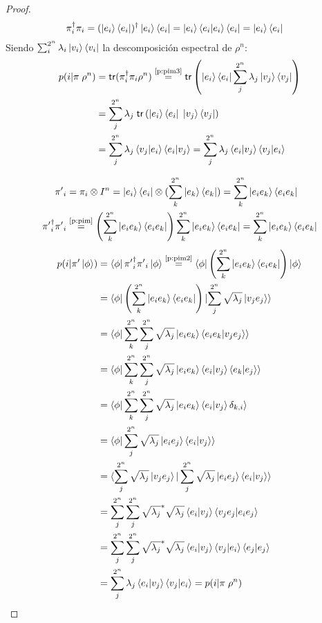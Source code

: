 \begin{proof}
\begin{align}
   \pi_i^\dagger\pi_i &= (\ket{e_i}\bra{e_i})^\dagger \ket{e_i}\bra{e_i} = \ket{e_i}\braket{e_i|e_i}\bra{e_i} = \ket{e_i}\bra{e_i} \label{p:pim3}
\end{align}
Siendo $\sum_i^{2^n} \lambda_i \ket{v_i}\bra{v_i}$ la descomposición espectral de $\rho^n$:
\begin{align}
    p(i|\pi\;\rho^n) &= \mathsf{tr}(\pi_i^\dagger\pi_i \rho^n) \stackrel{\textrm{\ref{p:pim3}}}{=} \mathsf{tr}\left(\ket{e_i}\bra{e_i} \sum_j^{2^n} \lambda_j \ket{v_j}\bra{v_j}\right) \nonumber \\
    &= \sum_j^{2^n} \lambda_j\; \mathsf{tr}\left(\ket{e_i}\bra{e_i}\; \ket{v_j}\bra{v_j}\right) \nonumber  \\
    &= \sum_j^{2^n} \lambda_j \braket{v_j|e_i} \braket{e_i|v_j} = \sum_j^{2^n} \lambda_j  \braket{e_i|v_j} \braket{v_j|e_i}
\end{align}

\begin{align}
    {\pi'}_i &= \pi_i \otimes I^n = \ket{e_i}\bra{e_i} \otimes (\sum_k^{2^n} \ket{e_k}\bra{e_k}) = \sum_k^{2^n} \ket{e_i e_k}\bra{e_i e_k} \label{p:pim} \\
    {\pi'}_i^\dagger{\pi'}_i &\stackrel{\textrm{\ref{p:pim}}}{=} \left(\sum_k^{2^n} \ket{e_i e_k}\bra{e_i e_k}\right) \sum_k^{2^n} \ket{e_i e_k}\bra{e_i e_k} = \sum_k^{2^n} \ket{e_i e_k}\bra{e_i e_k} \label{p:pim2}
\end{align}
\begin{align}
    p(i|\pi'\ket{\phi}) &= \bra{\phi}{\pi'}_i^\dagger{\pi'}_i\ket{\phi} \stackrel{\textrm{\ref{p:pim2}}}{=} \bra{\phi} \left(\sum_k^{2^n} \ket{e_i e_k}\bra{e_i e_k}\right)\ket{\phi} \nonumber \\
    &= \bra{\phi} \left(\sum_k^{2^n} \ket{e_i e_k}\bra{e_i e_k}\right)\ket{\sum_j^{2^n} \sqrt{\lambda_j}\ket{v_j e_j}} \nonumber \\
    &= \braket{\phi| \sum_k^{2^n}\sum_j^{2^n}\sqrt{\lambda_j} \ket{e_i e_k}\braket{e_i e_k|v_j e_j}} \nonumber \\
    &= \braket{\phi| \sum_k^{2^n}\sum_j^{2^n}\sqrt{\lambda_j} \ket{e_i e_k}\braket{e_i|v_j}\braket{e_k|e_j}} \nonumber \\
    &= \braket{\phi | \sum_k^{2^n}\sum_j^{2^n}\sqrt{\lambda_j} \ket{e_i e_k}\braket{e_i|v_j}\delta_{k,i} } \nonumber \\
    &= \braket{\phi | \sum_j^{2^n}\sqrt{\lambda_j} \ket{e_i e_j}\braket{e_i|v_j}} \nonumber \\
    &= \braket{\sum_j^{2^n} \sqrt{\lambda_j}\ket{v_j e_j} | \sum_j^{2^n}\sqrt{\lambda_j} \ket{e_i e_j}\braket{e_i|v_j}} \nonumber \\
    &= \sum_j^{2^n}\sum_j^{2^n} \sqrt{\lambda_j}^*\sqrt{\lambda_j}\braket{e_i|v_j}\braket{v_j e_j | e_i e_j}  \nonumber \\
    &= \sum_j^{2^n}\sum_j^{2^n} \sqrt{\lambda_j}^*\sqrt{\lambda_j}\braket{e_i|v_j}\braket{v_j|e_i}\braket{e_j | e_j}\nonumber \\
    &= \sum_j^{2^n} \lambda_j\braket{e_i|v_j}\braket{v_j|e_i} = p(i|\pi\;\rho^n)  
\end{align}

\end{proof}


